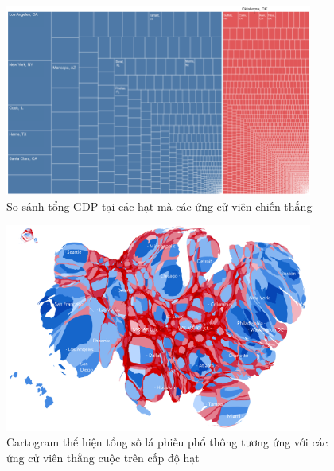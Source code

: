 \documentclass[10pt]{beamer}
\theoremstyle{remark}
\theoremstyle{definition}
\begin{document}
\begin{frame}
    \begin{figure}[h!]
        \centering
        \includegraphics[width=0.9\textwidth]{figures/County_GDP_Treemap.png}
        \caption{So sánh tổng GDP tại các hạt mà các ứng cử viên chiến thắng}
    \end{figure}
\end{frame}

\begin{frame}
	\begin{figure}[h!]
        \centering
        \includegraphics[width=0.9\textwidth]{figures/County_Total_Vote_Cartogram.png}
        \caption{Cartogram thể hiện tổng số lá phiếu phổ thông tương ứng với các ứng cử viên thắng cuộc trên cấp độ hạt}
    \end{figure}
\end{frame}
\end{document}

